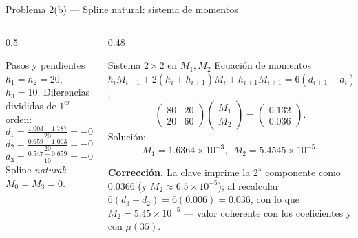\documentclass[aspectratio=169,10pt]{beamer}
\begin{document}
\begin{frame}{Problema 2(b) — Spline natural: sistema de momentos}
\begin{columns}[T]
\begin{column}{0.5\textwidth}
\begin{cardgear}{Pasos y pendientes}{\faTable}
{\footnotesize $h_1=h_2=20$, $h_3=10$. Diferencias divididas de $1^{er}$ orden:
\[
d_1=\tfrac{1.003-1.787}{20}=-0.0392,
\]
\[
d_2=\tfrac{0.659-1.003}{20}=-0.0172,
\]
\[
d_3=\tfrac{0.547-0.659}{10}=-0.0112.
\]
Spline \emph{natural}: $M_0=M_3=0$.}
\end{cardgear}
\end{column}
\begin{column}{0.48\textwidth}
\begin{cardgear}{Sistema $2\times2$ en $M_1,M_2$}{\faCalculator}
{\scriptsize Ecuación de momentos $h_{i}M_{i-1}+2(h_i{+}h_{i+1})M_i+h_{i+1}M_{i+1}=6(d_{i+1}{-}d_i)$:
\[
\begin{pmatrix}80&20\\ 20&60\end{pmatrix}\!\!\begin{pmatrix}M_1\\M_2\end{pmatrix}=\begin{pmatrix}0.132\\ 0.036\end{pmatrix}.
\]
Solución:
\[
M_1=1.6364\!\times\!10^{-3},\ \ M_2=5.4545\!\times\!10^{-5}.
\]}
\end{cardgear}
\vspace{1mm}
\begin{cardnota}[\faExclamationTriangle]
{\scriptsize \textbf{Corrección.} La clave imprime la $2^{\text{a}}$ componente como $0.0366$ (y $M_2\!\approx\!6.5\!\times\!10^{-5}$); al recalcular $6(d_3{-}d_2)=6(0.006)=0.036$, con lo que $M_2=5.45\!\times\!10^{-5}$ — valor coherente con los coeficientes y con $\mu(35)$.}
\end{cardnota}
\end{column}
\end{columns}
\end{frame}
\end{document}
